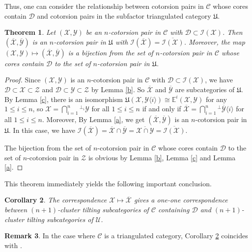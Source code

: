 \documentclass[a4paper,reqno,11pt]{amsart}
\newtheorem{theorem}{Theorem}[section]
\newtheorem{corollary}[theorem]{Corollary}
\theoremstyle{definition}
\newtheorem{remark}[theorem]{Remark}
\def\C{\mathcal{C}}
\def\D{\mathcal{D}}
\def\U{\mathcal{U}}
\def\X{\mathcal{X}}
\def\D{\mathcal{D}}
\def\Y{\mathcal{Y}}
\def\Z{\mathcal {Z}}
\def\I{\mathcal {I}}
\def\E{\mathbb{E}}
\begin{document}
Thus, one can consider the relationship between cotorsion pairs in $\C$ whose cores contain
$\D$ and cotorsion pairs in the subfactor triangulated category $\mathfrak{U}$.

\begin{theorem}\label{d}
Let $(\X,\Y)$ be an $n$-cotorsion pair in $\C$ with $\D\subset\I(\X)$. Then $(\overline{\X},\overline{\Y})$ is an $n$-cotorsion pair in $\mathfrak{U}$ with $\I(\overline{\X})=\overline{\I(\X)}$. Moreover, the map $(\X,\Y)\mapsto(\overline{\X},\overline{\Y})$ is a bijection from the set of $n$-cotorsion pair in $\C$ whose cores contain $\D$ to the set of $n$-cotorsion pair in $\mathfrak{U}$.
\end{theorem}

\begin{proof}
Since $(\X,\Y)$ is an $n$-cotorsion pair in $\C$ with $\D\subset\I(\X)$, we have $\D\subset\X\subset\Z$ and $\D\subset\Y\subset\Z$ by Lemma \ref{b}. So $\overline{\X}$ and $\overline{\Y}$ are subcategories of $\mathfrak{U}$. By Lemma \ref{c}, there is an isomorphism $\mathfrak{U}(\X,\Y\langle i\rangle)\cong\E^i(\X,\Y)$ for any $1\leq i\leq n$, so $\X=\bigcap\limits_{i=1}^{n}{^{\bot_i}}\Y$ for all $1\leq i\leq n$ if and only if $\overline{\X}=\bigcap\limits_{i=1}^{n}{^\bot}\overline{\Y}\langle i\rangle$ for all $1\leq i\leq n$. Moreover, By Lemma \ref{a}, we get $(\overline{\X},\overline{\Y})$ is an $n$-cotorsion pair in $\mathfrak{U}$. In this case, we have  $\I(\overline{\X})=\overline{\X}\cap\overline{\Y}=\overline{\X\cap\Y}=\overline{\I(\X)}$.

The bijection from the set of $n$-cotorsion pair in $\C$ whose cores contain $\D$ to the set of $n$-cotorsion pair in $\Z$ is obvious by Lemma \ref{b}, Lemma \ref{c} and Lemma \ref{a}.
\end{proof}


This theorem immediately yields the following important conclusion.

\begin{corollary} \label{cor11}
The correspondence $\X\mapsto \overline{\X}$ gives
a one-one correspondence between $(n+1)$-cluster tilting subcategories of $\C$
containing $\D$ and $(n+1)$-cluster tilting subcategories of $\U$.
\end{corollary}

\begin{remark}
In the case where $\mathcal{C}$ is a triangulated category, Corollary \ref{cor11} coincides with \cite[Theorem 4.9(1)]{IY}.
\end{remark}
\end{document}
